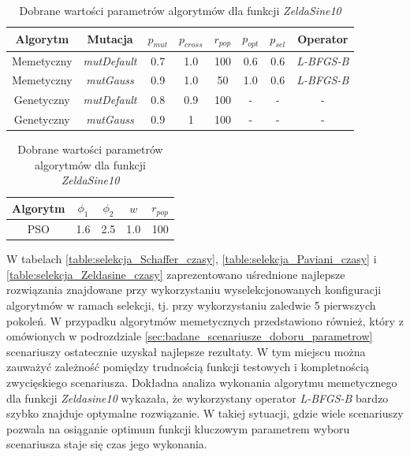 \begin{table}[ht]
\caption{Dobrane wartości parametrów algorytmów dla funkcji \emph{ZeldaSine10}}
\label{table:selekcja_Zeldasine_parametry}
\begin{center}
\begin{tabular}{|c|c|c|c|c|c|c|c|}
	\hline
	Algorytm & Mutacja & $p_{mut}$ & $p_{cross}$ & $r_{pop}$ & $p_{opt}$ & $p_{sel}$ & Operator\\
	\hline
	Memetyczny & \emph{mutDefault} & 0.7 & 1.0 & 100 & 0.6 & 0.6 & \emph{L-BFGS-B} \\
	Memetyczny & \emph{mutGauss}  & 0.9 & 1.0 & 50 & 1.0 & 0.6 & \emph{L-BFGS-B} \\
	Genetyczny & \emph{mutDefault} & 0.8 & 0.9 & 100 & - & - & - \\
	Genetyczny & \emph{mutGauss}  & 0.9 & 1 & 100 & - & - & - \\
	\hline
	\end{tabular}

\begin{tabular}{|c|c|c|c|c|}
	\hline
	Algorytm & $\phi_1$ & $\phi_2$ & $w$ & $r_{pop}$ \\
	\hline
	PSO & 1.6 & 2.5 & 1.0 & 100 \\
	\hline
\end{tabular}
\end{center}
\end{table}

\par
W tabelach \ref{table:selekcja_Schaffer_czasy}, \ref{table:selekcja_Paviani_czasy} i \ref{table:selekcja_Zeldasine_czasy} zaprezentowano uśrednione najlepsze rozwiązania znajdowane przy wykorzystaniu wyselekcjonowanych konfiguracji algorytmów w ramach selekcji, tj. przy wykorzystaniu zaledwie 5 pierwszych pokoleń. W przypadku algorytmów memetycznych przedstawiono również, który z omówionych w podrozdziale \ref{sec:badane_scenariusze_doboru_parametrow} scenariuszy ostatecznie uzyskał najlepsze rezultaty. W  tym miejscu można zauważyć zależność pomiędzy trudnością funkcji testowych i kompletnością zwycięskiego scenariusza. Dokładna analiza wykonania algorytmu memetycznego dla funkcji \emph{Zeldasine10} wykazała, że wykorzystany operator \emph{L-BFGS-B} bardzo szybko znajduje optymalne rozwiązanie. W takiej sytuacji, gdzie wiele scenariuszy pozwala na osiąganie optimum funkcji kluczowym parametrem wyboru scenariusza staje się czas jego wykonania. 

